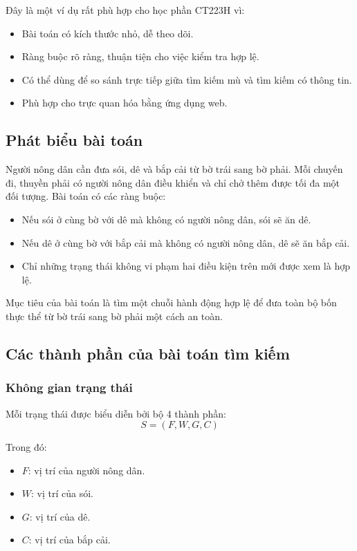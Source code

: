 \documentclass[a4paper,12pt]{article}
\begin{document}
Đây là một ví dụ rất phù hợp cho học phần CT223H vì:
\begin{itemize}
    \item Bài toán có kích thước nhỏ, dễ theo dõi.
    \item Ràng buộc rõ ràng, thuận tiện cho việc kiểm tra hợp lệ.
    \item Có thể dùng để so sánh trực tiếp giữa tìm kiếm mù và tìm kiếm có thông tin.
    \item Phù hợp cho trực quan hóa bằng ứng dụng web.
\end{itemize}

\subsection{Phát biểu bài toán}

Người nông dân cần đưa sói, dê và bắp cải từ bờ trái sang bờ phải. Mỗi chuyến đi, thuyền phải có người nông dân điều khiển và chỉ chở thêm được tối đa một đối tượng. Bài toán có các ràng buộc:
\begin{itemize}
    \item Nếu sói ở cùng bờ với dê mà không có người nông dân, sói sẽ ăn dê.
    \item Nếu dê ở cùng bờ với bắp cải mà không có người nông dân, dê sẽ ăn bắp cải.
    \item Chỉ những trạng thái không vi phạm hai điều kiện trên mới được xem là hợp lệ.
\end{itemize}

Mục tiêu của bài toán là tìm một chuỗi hành động hợp lệ để đưa toàn bộ bốn thực thể từ bờ trái sang bờ phải một cách an toàn.

\subsection{Các thành phần của bài toán tìm kiếm}

\subsubsection{Không gian trạng thái}

Mỗi trạng thái được biểu diễn bởi bộ 4 thành phần:
\[
S = (F, W, G, C)
\]

Trong đó:
\begin{itemize}
    \item $F$: vị trí của người nông dân.
    \item $W$: vị trí của sói.
    \item $G$: vị trí của dê.
    \item $C$: vị trí của bắp cải.
\end{itemize}
\end{document}
